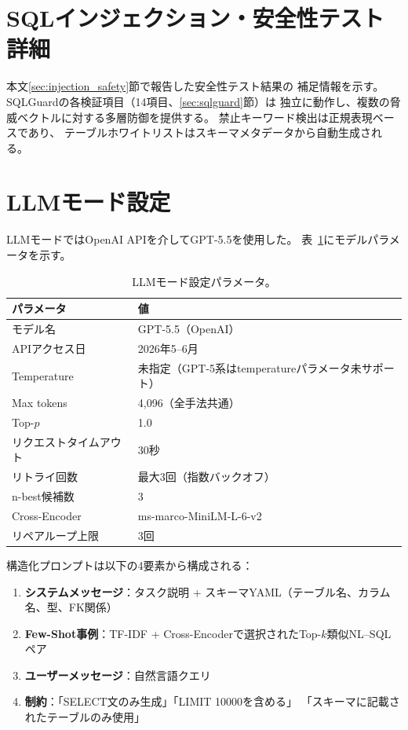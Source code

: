 \documentclass[5p,twocolumn]{elsarticle}
\begin{document}
\section{SQLインジェクション・安全性テスト詳細}
\label{sec:sup_injection}

本文\ref{sec:injection_safety}節で報告した安全性テスト結果の
補足情報を示す。
SQLGuardの各検証項目（14項目、\ref{sec:sqlguard}節）は
独立に動作し、複数の脅威ベクトルに対する多層防御を提供する。
禁止キーワード検出は正規表現ベースであり、
テーブルホワイトリストはスキーマメタデータから自動生成される。

\section{LLMモード設定}
\label{sec:sup_llm_config}

LLMモードではOpenAI APIを介してGPT-5.5を使用した。
表~\ref{tab:sup_llm_params}にモデルパラメータを示す。

\begin{table}[htbp]
  \centering
  \caption{LLMモード設定パラメータ。}
  \label{tab:sup_llm_params}
  \small
  \begin{tabular}{ll}
    \toprule
    パラメータ & 値 \\
    \midrule
    モデル名 & GPT-5.5（OpenAI） \\
    APIアクセス日 & 2026年5--6月 \\
    Temperature & 未指定（GPT-5系はtemperatureパラメータ未サポート） \\
    Max tokens & 4{,}096（全手法共通） \\
    Top-$p$ & 1.0 \\
    リクエストタイムアウト & 30秒 \\
    リトライ回数 & 最大3回（指数バックオフ） \\
    n-best候補数 & 3 \\
    Cross-Encoder & ms-marco-MiniLM-L-6-v2 \\
    リペアループ上限 & 3回 \\
    \bottomrule
  \end{tabular}
\end{table}

構造化プロンプトは以下の4要素から構成される：

\begin{enumerate}
  \item \textbf{システムメッセージ}：タスク説明 + スキーマYAML（テーブル名、カラム名、型、FK関係）
  \item \textbf{Few-Shot事例}：TF-IDF + Cross-Encoderで選択されたTop-$k$類似NL--SQLペア
  \item \textbf{ユーザーメッセージ}：自然言語クエリ
  \item \textbf{制約}：「SELECT文のみ生成」「LIMIT 10000を含める」
        「スキーマに記載されたテーブルのみ使用」
\end{enumerate}
\end{document}
